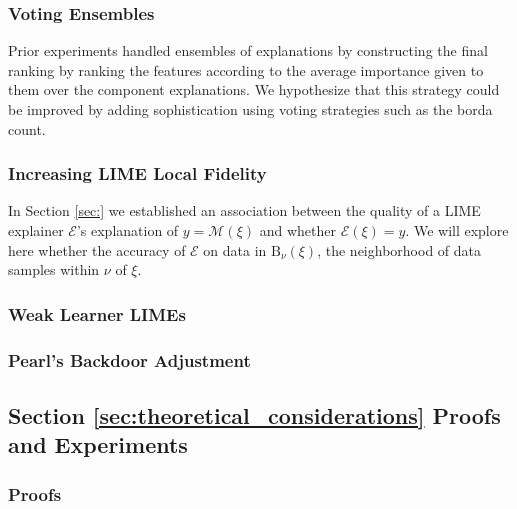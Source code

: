 \documentclass[mnsc,blindrev]{informs3}
\begin{document}
        \subsubsection{Voting Ensembles}
            Prior experiments handled ensembles of explanations by constructing the final ranking by ranking the features according to the average importance given to them over the component explanations. We hypothesize that this strategy could be improved by adding sophistication using voting strategies such as the borda count.  

        \subsubsection{Increasing LIME Local Fidelity}
            In Section \ref{sec:} we established an association between the quality of a LIME explainer $\mathcal{E}$'s explanation of $y=\mathcal{M}(\xi)$ and whether $\mathcal{E}(\xi) = y$. We will explore here whether the accuracy of $\mathcal{E}$ on data in $\text{B}_\nu(\xi)$, the neighborhood of data samples within $\nu$ of $\xi$. 

        \subsubsection{Weak Learner LIMEs}

        \subsubsection{Pearl's Backdoor Adjustment}
            \label{sec:backdoor_adjustment}

    
    \subsection{Section \ref{sec:theoretical_considerations} Proofs and Experiments}    
        \subsubsection{Proofs}
\end{document}

